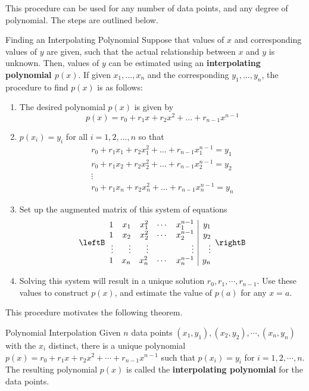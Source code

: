 This procedure can be used for any number of data points, and any degree of polynomial. The steps are outlined below.

\begin{procedure}{Finding an Interpolating Polynomial}\label{proc:findinginterpolynomial}
Suppose that values of $x$ and corresponding values of $y$ are given, such that the actual relationship between $x$ and $y$ is unknown. Then, values of $y$ can be estimated using an \textbf{interpolating polynomial $p(x)$}. If given $x_1, ..., x_n$ and the corresponding $y_1, ..., y_n$, the procedure to find $p(x)$ is as follows:
\begin{enumerate}
\item The desired polynomial $p(x)$ is given by 
\[
p(x) = r_0 + r_1 x + r_2 x^2 + ... + r_{n-1}x^{n-1}
\]
\item $p(x_i) = y_i$ for all $i = 1, 2, ...,n$ so that
\[
\begin{array}{c}
r_0 + r_1x_1 + r_2 x_1^2 + ... + r_{n-1}x_1^{n-1} = y_1 \\
r_0 + r_1x_2 + r_2 x_2^2 + ... + r_{n-1}x_2^{n-1} = y_2 \\
\vdots \\
r_0 + r_1x_n + r_2 x_n^2 + ... + r_{n-1}x_n^{n-1} = y_n 
\end{array}
\]
\item Set up the augmented matrix of this system of equations
\[
\leftB
\begin{array}{rrrrr|r}
1 & x_1 & x_1^2 & \cdots & x_1^{n-1} & y_1 \\
1 & x_2 & x_2^2 & \cdots & x_2^{n-1} & y_2 \\
\vdots & \vdots & \vdots & &\vdots & \vdots \\
1 & x_n & x_n^2 & \cdots & x_n^{n-1} & y_n \\
\end{array}
\rightB
\]

\item Solving this system will result in a unique solution $r_0, r_1, \cdots, r_{n-1}$. Use these values to construct $p(x)$, and estimate the value of $p(a)$ for any $x=a$. 
\end{enumerate}

\end{procedure}

This procedure motivates the following theorem.

\begin{theorem}{Polynomial Interpolation}\label{thm:polynomialinterpolation}
Given $n$ data points $(x_1, y_1), (x_2, y_2), \cdots, (x_n, y_n)$ with the $x_i$ distinct, there is a unique polynomial $p(x) = r_0 + r_1x + r_2x^2 + \cdots + r_{n-1}x^{n-1}$ such that $p(x_i) = y_i$ for $i=1,2,\cdots, n$. The resulting polynomial $p(x)$ is called the \textbf{interpolating polynomial} for the data points. 
\end{theorem}

